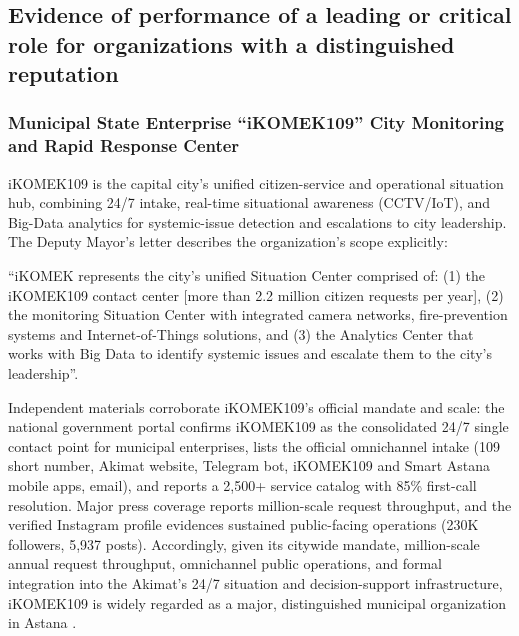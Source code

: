 \subsection{Evidence of \mrls performance of a leading or critical role for organizations with a distinguished reputation}

\label{subsec:Role}

\subsubsection{Municipal State Enterprise “iKOMEK109” City Monitoring and Rapid Response Center}

\label{subsubsec:RoleIKOMEK}

iKOMEK109 is the capital city’s unified citizen-service and operational situation hub, combining 24/7 intake, real-time situational awareness (CCTV/IoT), and Big-Data analytics for systemic-issue detection and escalations to city leadership. The Deputy Mayor’s letter describes the organization’s scope explicitly:
\begin{fullquote}
``iKOMEK represents the city’s unified Situation Center comprised of: (1) the iKOMEK109 contact center [more than 2.2 million citizen requests per year], (2) the monitoring Situation Center with integrated camera networks, fire-prevention systems and Internet-of-Things solutions, and (3) the Analytics Center that works with Big Data to identify systemic issues and escalate them to the city’s leadership''.
\end{fullquote}

Independent materials corroborate iKOMEK109’s official mandate and scale: the national government portal confirms iKOMEK109 as the consolidated 24/7 single contact point for municipal enterprises, lists the official omnichannel intake (109 short number, Akimat website, Telegram bot, iKOMEK109 and Smart Astana mobile apps, email), and reports a 2,500+ service catalog with 85\% first-call resolution. Major press coverage reports million-scale request throughput, and the verified Instagram profile evidences sustained public-facing operations (230K followers, 5,937 posts). Accordingly, given its citywide mandate, million-scale annual request throughput, omnichannel public operations, and formal integration into the Akimat’s 24/7 situation and decision-support infrastructure, iKOMEK109 is widely regarded as a major, distinguished municipal organization in Astana .

